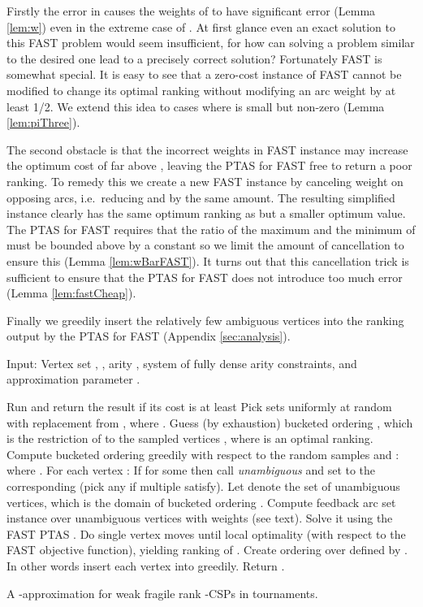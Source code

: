 \documentclass[dvips,11pt,letter]{article}
\newcommand{\fast}{\textsc{FAST}}
\begin{document}
{Firstly the error in  causes the weights of  to have significant error (Lemma \ref{lem:w}) even in the extreme case of . At first glance even an exact solution to this \fast{} problem would seem insufficient, for how can solving a problem similar to the desired one lead to a precisely correct solution? Fortunately \fast{} is somewhat special. It is easy to see that a zero-cost instance of \fast{} cannot be modified to change its optimal ranking without modifying an arc weight by at least 1/2. We extend this idea to cases where  is small but non-zero (Lemma \ref{lem:piThree}).

The second obstacle is that the incorrect weights in FAST instance  may increase the optimum cost of  far above , leaving the PTAS for FAST free to return a poor ranking. To remedy this we create a new FAST instance  by canceling weight on opposing arcs, i.e.\ reducing  and  by the same amount. The resulting simplified instance  clearly has the same optimum ranking as  but a smaller optimum value. The PTAS for FAST requires that the ratio of the maximum and the minimum of  must be bounded above by a constant so we limit the amount of cancellation to ensure this (Lemma \ref{lem:wBarFAST}). It turns out that this cancellation trick is sufficient to ensure that the PTAS for FAST does not introduce too much error (Lemma \ref{lem:fastCheap}).

Finally we greedily insert the relatively few ambiguous vertices into the ranking output by the PTAS for \fast{} \cite{mathieu09fast} (Appendix \ref{sec:analysis}).

\bigskip

\begin{algorithm}[btp]
Input: Vertex set , , arity , system  of fully dense arity  constraints, and approximation parameter .
\begin{algorithmic}[1]
\STATE Run  and return the result if its cost is at least 
\STATE Pick sets  uniformly at random with replacement from , where .  Guess (by exhaustion) bucketed ordering , which is the restriction of  to the sampled vertices , where  is an optimal ranking.
\STATE Compute bucketed ordering  greedily with respect to the random samples and : \\
 where .
\STATE For each vertex : If  for some  then call  \emph{unambiguous} and set  to the corresponding  (pick any if multiple  satisfy). Let  denote the set of unambiguous vertices, which is the domain of bucketed ordering .
\STATE Compute feedback arc set instance over unambiguous vertices  with weights  (see text). Solve it using the \fast{} PTAS \cite{mathieu09fast}. Do single vertex moves until local optimality (with respect to the \fast{} objective function), yielding ranking  of .
\STATE Create ordering  over  defined by . In other words insert each vertex  into  greedily. 
\STATE Return .
\end{algorithmic}
\caption{A -approximation for weak fragile rank -CSPs in tournaments.\label{alg:main}}
\end{algorithm}


}
\end{document}
